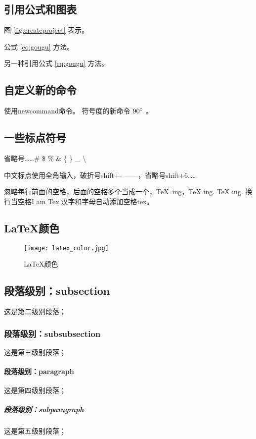 \subsection{引用公式和图表}
图 \ref{fig:createproject} 表示。

公式 \ref{eq:gougu} 方法。

另一种引用公式 \eqref{eq:gougu} 方法。 %

\subsection{自定义新的命令}
使用newcommand命令。
符号度的新命令 $90^\circ$ 。%

\subsection{一些标点符号}
省略号\ldots \dots \# \quad \$ \quad \% \quad \& \quad \{ \quad \} \quad \_ \quad \textbackslash

中文标点使用全角输入，破折号shift+- ——，省略号shift+6……

忽略每行前面的空格，后面的空格多个当成一个，\TeX\ ing，\TeX{} ing. {\TeX} ing. 换行当空格I 
am Tex.汉字和字母自动添加空格tex。

\subsection{\LaTeX 颜色}
\begin{figure}[H]
\centering
\texttt{[image: latex\_color.jpg]}
\caption{\LaTeX 颜色}
\label{fig:latex color}
\end{figure}

\subsection{段落级别：subsection}
这是第二级别段落；
\subsubsection{段落级别：subsubsection}
这是第三级别段落；
\paragraph{段落级别：paragraph}
这是第四级别段落；
\subparagraph{段落级别：subparagraph}
这是第五级别段落；
